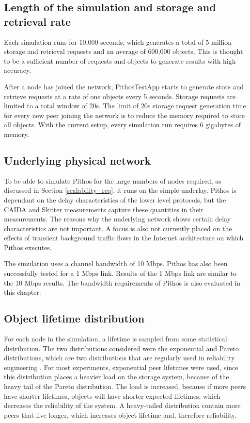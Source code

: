\subsection{Length of the simulation and storage and retrieval rate}
Each simulation runs for 10,000 seconds, which generates a total of 5 million storage and retrieval requests and an average of 600,000 objects. This is thought to be a sufficient number of requests and objects to generate results with high accuracy.

After a node has joined the network, PithosTestApp starts to generate store and retrieve requests at a rate of one objects every 5 seconds. Storage requests are limited to a total window of 20s. The limit of 20s storage request generation time for every new peer joining the network is to reduce the memory required to store all objects. With the current setup, every simulation run requires 6 gigabytes of memory.

\subsection{Underlying physical network}
To be able to simulate Pithos for the large numbers of nodes required, as discussed in Section \ref{scalability_req}, it runs on the simple underlay. Pithos is dependant on the delay characteristics of the lower level protocols, but the CAIDA and Skitter measurements capture these quantities in their measurements. The reasons why the underlying network shows certain delay characteristics are not important. A focus is also not currently placed on the effects of transient background traffic flows in the Internet architecture on which Pithos executes.

The simulation uses a channel bandwidth of 10 Mbps. Pithos has also been successfully tested for a 1 Mbps link. Results of the 1 Mbps link are similar to the 10 Mbps results. The bandwidth requirements of Pithos is also evaluated in this chapter.

\subsection{Object lifetime distribution}
For each node in the simulation, a lifetime is sampled from some statistical distribution. The two distributions considered were the exponential and Pareto distributions, which are two distributions that are regularly used in reliability engineering \cite{rausand2004systemreliability}. For most experiments, exponential peer lifetimes were used, since this distribution places a heavier load on the storage system, because of the heavy tail of the Pareto distribution. The load is increased, because if more peers have shorter lifetimes, objects will have shorter expected lifetimes, which decreases the reliability of the system. A heavy-tailed distribution contain more peers that live longer, which increases object lifetime and, therefore reliability.

